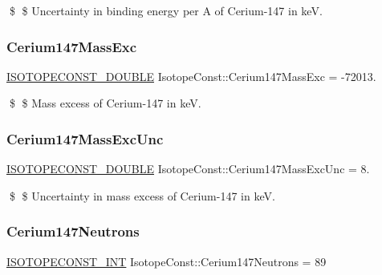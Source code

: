 \$ \$ Uncertainty in binding energy per A of Cerium-\/147 in keV. \mbox{\label{group___isotope_const-_cerium-_ce147_gac3d96aa963618faed0d71dbeddda86fc}} 
\subsubsection{\texorpdfstring{Cerium147\+Mass\+Exc}{Cerium147MassExc}}
{\footnotesize\ttfamily \mbox{\hyperlink{group___isotope_const-_macros_ga8f45a7272ce02c0b4c65c44636ed719a}{I\+S\+O\+T\+O\+P\+E\+C\+O\+N\+S\+T\+\_\+\+D\+O\+U\+B\+LE}} Isotope\+Const\+::\+Cerium147\+Mass\+Exc = -\/72013.}

\$ \$ Mass excess of Cerium-\/147 in keV. \mbox{\label{group___isotope_const-_cerium-_ce147_gaff2fce2d3544c81c68dd8855d9b48654}} 
\subsubsection{\texorpdfstring{Cerium147\+Mass\+Exc\+Unc}{Cerium147MassExcUnc}}
{\footnotesize\ttfamily \mbox{\hyperlink{group___isotope_const-_macros_ga8f45a7272ce02c0b4c65c44636ed719a}{I\+S\+O\+T\+O\+P\+E\+C\+O\+N\+S\+T\+\_\+\+D\+O\+U\+B\+LE}} Isotope\+Const\+::\+Cerium147\+Mass\+Exc\+Unc = 8.}

\$ \$ Uncertainty in mass excess of Cerium-\/147 in keV. \mbox{\label{group___isotope_const-_cerium-_ce147_gad275fade596e67e056919823c2565cc8}} 
\subsubsection{\texorpdfstring{Cerium147\+Neutrons}{Cerium147Neutrons}}
{\footnotesize\ttfamily \mbox{\hyperlink{group___isotope_const-_macros_ga5f18360b3e99483a35c32d789e62621c}{I\+S\+O\+T\+O\+P\+E\+C\+O\+N\+S\+T\+\_\+\+I\+NT}} Isotope\+Const\+::\+Cerium147\+Neutrons = 89}

